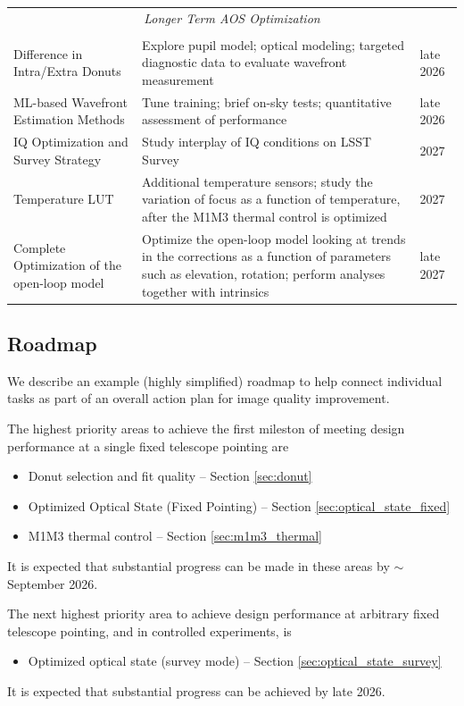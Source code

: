 \documentclass[SO,lsst,authoryear,toc]{lsstdoc}
\begin{document}
\begin{table}
\begin{tabular}{p{4.5cm} p{9cm} p{1.5cm}}
\multicolumn{3}{c}{\emph{Longer Term AOS Optimization}} \\
 & & \\
\hline
Difference in Intra/Extra Donuts & Explore pupil model; optical modeling; targeted diagnostic data to evaluate wavefront measurement & late 2026 \\
\hline
ML-based Wavefront Estimation Methods & Tune training; brief on-sky tests; quantitative assessment of performance & late 2026 \\
\hline
IQ Optimization and Survey Strategy & Study interplay of IQ conditions on LSST Survey & 2027 \\
\hline
Temperature LUT & Additional temperature sensors; study the variation of focus as a function of temperature, after the M1M3 thermal control is optimized & 2027 \\
\hline
Complete Optimization of the open-loop model & Optimize the open-loop model looking at trends in the corrections as a function of parameters such as elevation, rotation; perform analyses together with intrinsics & late 2027 \\
\hline
\end{tabular}
\end{table}

\subsection{Roadmap}

We describe an example (highly simplified) roadmap to help connect individual tasks as part of an overall action plan for image quality improvement.

The highest priority areas to achieve the first mileston of meeting design performance at a single fixed telescope pointing are
\begin{itemize}
  \item Donut selection and fit quality -- Section \ref{sec:donut}
  \item Optimized Optical State (Fixed Pointing) -- Section \ref{sec:optical_state_fixed}
  \item M1M3 thermal control -- Section \ref{sec:m1m3_thermal}
\end{itemize}
It is expected that substantial progress can be made in these areas by $\sim$September 2026.

The next highest priority area to achieve design performance at arbitrary fixed telescope pointing, and in controlled experiments, is
\begin{itemize}
  \item Optimized optical state (survey mode) -- Section \ref{sec:optical_state_survey}
\end{itemize}
It is expected that substantial progress can be achieved by late 2026.
\end{document}
